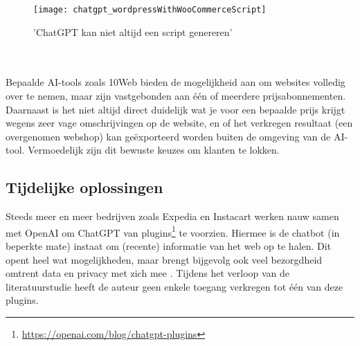 \begin{figure}
    \caption{'ChatGPT kan niet altijd een script genereren'}
    \label{chatgpt_weigert_complexe_vragen}
    \begin{center}
        \texttt{[image: chatgpt\_wordpressWithWooCommerceScript]}
    \end{center}
\end{figure}
\\\\
Bepaalde AI-tools zoals 10Web bieden de mogelijkheid aan om websites volledig over te nemen, maar zijn vastgebonden aan één of meerdere prijsabonnementen. Daarnaast is het niet altijd direct duidelijk wat je voor een bepaalde prijs krijgt wegens zeer vage omschrijvingen op de website, en of het verkregen resultaat (een overgenomen webshop) kan geëxporteerd worden buiten de omgeving van de AI-tool. Vermoedelijk zijn dit bewuste keuzes om klanten te lokken.  

\subsection{Tijdelijke oplossingen}
Steeds meer en meer bedrijven zoals Expedia en Instacart werken nauw samen met OpenAI om ChatGPT van plugins\footnote{\href{https://openai.com/blog/chatgpt-plugins}{https://openai.com/blog/chatgpt-plugins}} te voorzien. Hiermee is de chatbot (in beperkte mate) instaat om (recente) informatie van het web op te halen. Dit opent heel wat mogelijkheden, maar brengt bijgevolg ook veel bezorgdheid omtrent data en privacy met zich mee \autocite{WillKnight2023}. Tijdens het verloop van de literatuurstudie heeft de auteur geen enkele toegang verkregen tot één van deze plugins.
